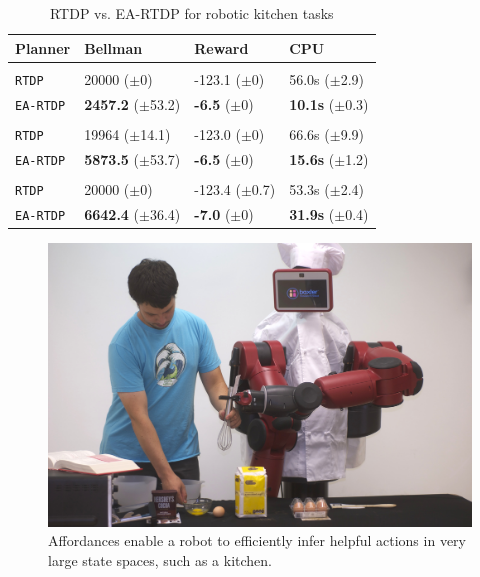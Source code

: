 \documentclass[letterpaper]{article}
\newcommand{\ra}[1]{\renewcommand{\arraystretch}{#1}} %
\begin{document}
\begin{table}[t]
\ra{1.1}
\small
\begin{tabular}{@{}llll@{}}\toprule
Planner & Bellman & Reward & CPU \\ \midrule
&\hspace{-10mm}{\it Dry Ingredients} \\
\texttt{RTDP} 	& 20000 ($\pm$0) 			& {-123.1} ($\pm$0)  & {56.0s}   ($\pm$2.9) \\
\texttt{EA-RTDP} 	& {\bf 2457.2} ($\pm$53.2) 		& {\bf -6.5}   ($\pm$0) & {\bf 10.1s}   ($\pm$0.3) \\  \hline
&\hspace{-10mm}{\it Wet Ingredients} \\
\texttt{RTDP} 	& 19964 ($\pm$14.1) 			& { -123.0}   ($\pm$0) & 66.6s   ($\pm$9.9) \\
\texttt{EA-RTDP} 	& {\bf 5873.5} ($\pm$53.7) 		& {\bf -6.5}   ($\pm$0) & {\bf 15.6s}   ($\pm$1.2) \\ \hline
&\hspace{-10mm}{\it Brownie Batter} \\
\texttt{RTDP} 	& 20000 ($\pm$0) 			& -123.4   ($\pm$0.7) & { 53.3s}   ($\pm$2.4) \\
\texttt{EA-RTDP} 	& {\bf 6642.4} ($\pm$36.4) 		& {\bf -7.0}   ($\pm$0) & {\bf 31.9s}   ($\pm$0.4) \\ 
\bottomrule
\end{tabular}
\caption{RTDP vs. EA-RTDP for robotic kitchen tasks}
\label{table:baxter_results}
\end{table}




\begin{figure}[b]
\centering
\includegraphics[width=0.75\linewidth]{figures/baxter.jpg}%
  \caption{Affordances enable a robot to efficiently infer helpful actions in
    very large state spaces, such as a kitchen.}
  \label{fig:baxter_results}
\end{figure}
\end{document}
